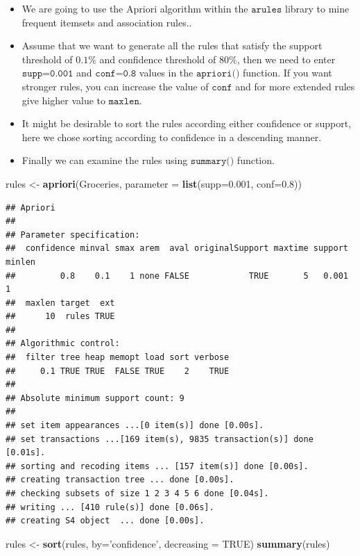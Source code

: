 \documentclass[
]{book}
\newenvironment{Shaded}{\begin{snugshade}}{\end{snugshade}}
\newcommand{\DataTypeTok}[1]{\textcolor[rgb]{0.13,0.29,0.53}{#1}}
\newcommand{\FloatTok}[1]{\textcolor[rgb]{0.00,0.00,0.81}{#1}}
\newcommand{\KeywordTok}[1]{\textcolor[rgb]{0.13,0.29,0.53}{\textbf{#1}}}
\newcommand{\NormalTok}[1]{#1}
\newcommand{\OtherTok}[1]{\textcolor[rgb]{0.56,0.35,0.01}{#1}}
\newcommand{\StringTok}[1]{\textcolor[rgb]{0.31,0.60,0.02}{#1}}
\begin{document}
\begin{itemize}
\item
  We are going to use the Apriori algorithm within the \(\texttt{arules}\) library to mine frequent itemsets and association rules..
\item
  Assume that we want to generate all the rules that satisfy the support threshold of \(0.1\%\) and confidence threshold of \(80\%\), then we need to enter \(\texttt{supp=0.001}\) and \(\texttt{conf=0.8}\) values in the \(\texttt{apriori()}\) function. If you want stronger rules, you can increase the value of \(\texttt{conf}\) and for more extended rules give higher value to \(\texttt{maxlen}\).
\item
  It might be desirable to sort the rules according either confidence or support, here we chose sorting according to confidence in a descending manner.
\item
  Finally we can examine the rules using \(\texttt{summary()}\) function.
\end{itemize}

\begin{Shaded}
\begin{Highlighting}[]
\NormalTok{rules <-}\StringTok{ }\KeywordTok{apriori}\NormalTok{(Groceries, }\DataTypeTok{parameter =} \KeywordTok{list}\NormalTok{(}\DataTypeTok{supp=}\FloatTok{0.001}\NormalTok{, }\DataTypeTok{conf=}\FloatTok{0.8}\NormalTok{))}
\end{Highlighting}
\end{Shaded}

\begin{verbatim}
## Apriori
## 
## Parameter specification:
##  confidence minval smax arem  aval originalSupport maxtime support minlen
##         0.8    0.1    1 none FALSE            TRUE       5   0.001      1
##  maxlen target  ext
##      10  rules TRUE
## 
## Algorithmic control:
##  filter tree heap memopt load sort verbose
##     0.1 TRUE TRUE  FALSE TRUE    2    TRUE
## 
## Absolute minimum support count: 9 
## 
## set item appearances ...[0 item(s)] done [0.00s].
## set transactions ...[169 item(s), 9835 transaction(s)] done [0.01s].
## sorting and recoding items ... [157 item(s)] done [0.00s].
## creating transaction tree ... done [0.00s].
## checking subsets of size 1 2 3 4 5 6 done [0.04s].
## writing ... [410 rule(s)] done [0.06s].
## creating S4 object  ... done [0.00s].
\end{verbatim}

\begin{Shaded}
\begin{Highlighting}[]
\NormalTok{rules <-}\StringTok{ }\KeywordTok{sort}\NormalTok{(rules, }\DataTypeTok{by=}\StringTok{'confidence'}\NormalTok{, }\DataTypeTok{decreasing =} \OtherTok{TRUE}\NormalTok{)}
\KeywordTok{summary}\NormalTok{(rules)}
\end{Highlighting}
\end{Shaded}
\end{document}
